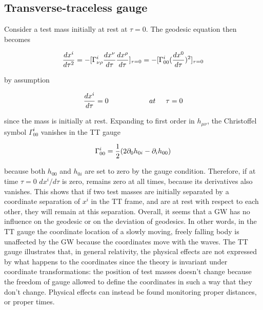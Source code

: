 \documentclass[binding=0.6cm, LaM]{sapthesis}
\begin{document}
\subsection{Transverse-traceless gauge}

	Consider a test mass initially at rest at $\tau = 0$. The geodesic equation then becomes

		\begin{equation}
		{{dx^i}\over{d\tau^2}} = -[\Gamma^i_{\nu\rho}{{dx^{\nu}}\over{d\tau}}{{dx^{\rho}}\over{d\tau}}]_{\tau=0} \\ 
		= - [ \Gamma^i_{00}({{dx^0}\over{d\tau}})^2]_{\tau=0}
		\end{equation}

	by assumption
		
		\begin{equation}
		{{dx^i}\over{d\tau}} = 0 \hspace*{2cm} at \hspace*{0.5cm}\tau = 0
		\end{equation}

	since the mass is initially at rest. Expanding to first order in $h_{\mu\nu}$, 
	the Christoffel symbol $\Gamma^i_{00}$ vanishes in the TT gauge

		\begin{equation}
		\Gamma^i_{00} = {1 \over {2}}(2\partial_{0}h_{0i} - \partial_i h_{00})
		\end{equation}

	because both $h_{00}$ and $h_{0i}$ are set to zero by the gauge condition. 
	Therefore, if at time $\tau = 0$ $dx^i/d\tau$ is zero, remains zero at all times, 
	because its derivatives also vanishes.
	This shows that if two test masses are initially separated by a coordinate separation of $x^i$ in the TT frame, 
	and are at rest with respect to each other, they will remain at this separation.
	Overall, it seems that a GW has no influence on the geodesic or on the deviation of geodesics.
	In other words, in the TT gauge the coordinate location of a slowly moving, freely falling body is unaffected 
	by the GW because the coordinates move with the waves.
	The TT gauge illustrates that, in general relativity, the physical effects are not expressed by what happens 
	to the coordinates since the theory is invariant under coordinate transformations:
	the position of test masses doesn't change because the freedom of gauge allowed to define the coordinates 
	in such a way that they don't change.
	Physical effects can instead be found monitoring proper distances, or proper times.
\end{document}
